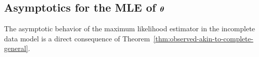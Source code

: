 \documentclass[]{imsart}
\newcommand{\1}{\mathds{1}}
\numberwithin{equation}{section}
\theoremstyle{plain}
\newtheorem{proposition}[thm]{Proposition}
\theoremstyle{remark}
\begin{document}
% 
% 









\subsection{Asymptotics for the MLE of $\boldsymbol{\theta}$}

The asymptotic behavior of the maximum likelihood estimator in the incomplete data model is a direct consequence of Theorem~\ref{thm:observed-akin-to-complete-general}.
\end{document}
